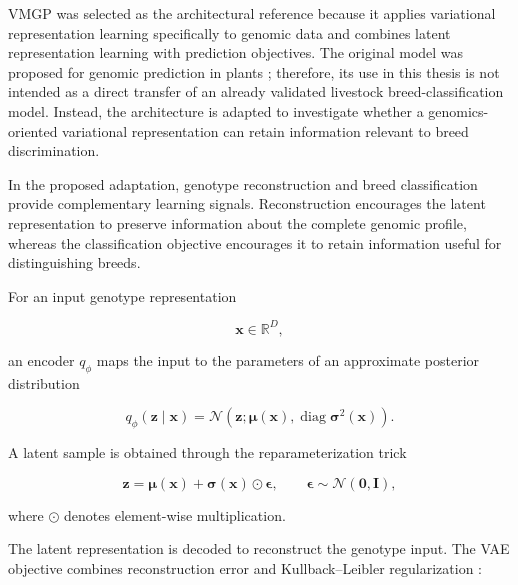 VMGP was selected as the architectural reference because it applies
variational representation learning specifically to genomic data and
combines latent representation learning with prediction objectives.
The original model was proposed for genomic prediction in plants
\cite{zhao2025vmgp}; therefore, its use in this thesis is not intended
as a direct transfer of an already validated livestock
breed-classification model. Instead, the architecture is adapted to
investigate whether a genomics-oriented variational representation can
retain information relevant to breed discrimination.

In the proposed adaptation, genotype reconstruction and breed
classification provide complementary learning signals. Reconstruction
encourages the latent representation to preserve information about
the complete genomic profile, whereas the classification objective
encourages it to retain information useful for distinguishing breeds.

For an input genotype representation

\begin{equation}
    \mathbf{x}
    \in
    \mathbb{R}^{D},
\end{equation}

an encoder $q_{\phi}$ maps the input to the parameters of an
approximate posterior distribution

\begin{equation}
    q_{\phi}
    (
        \mathbf{z}
        \mid
        \mathbf{x}
    )
    =
    \mathcal{N}
    \left(
        \mathbf{z};
        \boldsymbol{\mu}(\mathbf{x}),
        \operatorname{diag}
        \boldsymbol{\sigma}^{2}(\mathbf{x})
    \right).
    \label{eq:vae_posterior}
\end{equation}

A latent sample is obtained through the reparameterization trick
\cite{kingma2013auto, rezende2014stochastic}

\begin{equation}
    \mathbf{z}
    =
    \boldsymbol{\mu}(\mathbf{x})
    +
    \boldsymbol{\sigma}(\mathbf{x})
    \odot
    \boldsymbol{\epsilon},
    \qquad
    \boldsymbol{\epsilon}
    \sim
    \mathcal{N}
    (
        \mathbf{0},
        \mathbf{I}
    ),
    \label{eq:reparameterization}
\end{equation}

where $\odot$ denotes element-wise multiplication.

The latent representation is decoded to reconstruct the genotype
input.
The VAE objective combines reconstruction error and
Kullback--Leibler regularization
\cite{kingma2013auto}:

